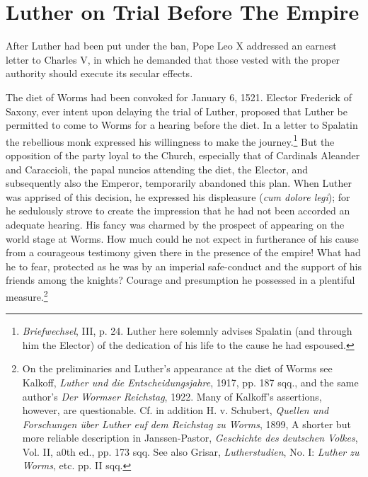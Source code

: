 \section{Luther on Trial Before The Empire}

After Luther had been put under the ban, Pope Leo X addressed an
earnest letter to Charles V, in which he demanded that those vested
with the proper authority should execute its secular effects.

The diet of Worms had been convoked for January 6, 1521. Elector Frederick
of Saxony, ever intent upon delaying the trial of
Luther, proposed that Luther be permitted to come to Worms
for a hearing before the diet. In a letter to Spalatin the rebellious
monk expressed his willingness to make the journey.\footnote
{\textit{Briefwechsel}, III, p. 24. Luther here solemnly advises Spalatin (and through him the
Elector) of the dedication of his life to the cause he had espoused.}
But the opposition
of the party loyal to the Church, especially that of Cardinals
Aleander and Caraccioli, the papal nuncios attending the diet, the
Elector, and subsequently also the Emperor, temporarily abandoned
this plan. When Luther was apprised of this decision, he expressed his
displeasure (\textit{cum dolore legi}); for he sedulously strove to create the
impression that he had not been accorded an adequate hearing. His
fancy was charmed by the prospect of appearing on the world stage
at Worms. How much could he not expect in furtherance of his
cause from a courageous testimony given there in the presence of
the empire! What had he to fear, protected as he was by an imperial
safe-conduct and the support of his friends among the knights?
Courage and presumption he possessed in a plentiful measure.\footnote
{On the preliminaries and Luther’s appearance at the diet of Worms see Kalkoff, \textit{Luther
und die Entscheidungsjahre}, 1917, pp. 187 sqq., and the same author’s \textit{Der Wormser
Reichstag}, 1922. Many of Kalkoff’s assertions, however, are questionable. Cf. in addition H.
v. Schubert, \textit{Quellen und Forschungen über Luther euf dem Reichstag zu Worms}, 1899,
A shorter but more reliable description in Janssen-Pastor, \textit{Geschichte des deutschen Volkes},
Vol. II, a0th ed., pp. 173 sqq. See also Grisar, \textit{Lutherstudien}, No. I: \textit{Luther zu Worms}, etc.
pp. II sqq.}

